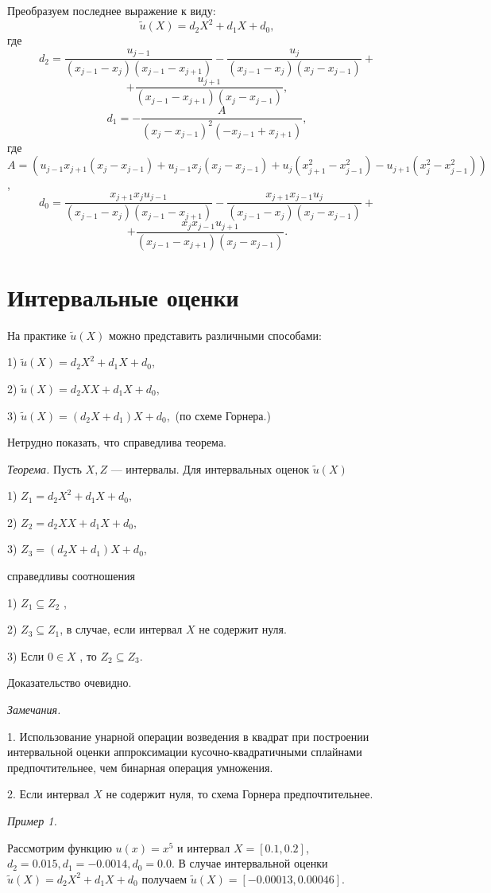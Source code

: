 \documentclass{spisok-article}
\begin{document}
Преобразуем последнее выражение к виду:
$$\widetilde{u}(X)=d_2X^2+d_1X+d_0,$$ где
  $$d_2= \frac{u_{j-1}}{(x_{j-1}-x_j)(x_{j-1}-x_{j+1})}-
  \frac{u_{j}}{(x_{j-1}-x_j)(x_j-x_{j-1})}+$$ $$+\frac{u_{j+1}}
  {(x_{j-1}-x_{j+1})(x_j-x_{j-1})},$$
$$d_1=  -\frac{A}{(x_j-x_{j-1})^2(-x_{j-1}+x_{j+1})},$$
где $A=(u_{j-1}x_{j+1}(x_j-x_{j-1})+u_{j-1}x_j(x_j-x_{j-1})
+u_j(x_{j+1}^2-x_{j-1}^2)-u_{j+1}(x_j^2-x_{j-1}^2))$,
$$d_0= \frac{x_{j+1}x_ju_{j-1}}{(x_{j-1}-x_j)(x_{j-1}-x_{j+1})}
-\frac{x_{j+1}x_{j-1}u_j}{(x_{j-1}-x_j)(x_j-x_{j-1})} +$$$$
+\frac{x_jx_{j-1}u_{j+1}}{(x_{j-1}-x_{j+1})(x_j-x_{j-1})}.$$

\section{Интервальные оценки}
На практике  $\widetilde{u}(X)$  можно представить различными способами:

1) $\widetilde{u}(X)=d_2X^2+d_1X+d_0,$

        2) $\widetilde{u}(X)=d_2XX+d_1X+d_0,$

3)   $\widetilde{u}(X)=(d_2X+d_1)X+d_0,$ (по схеме Горнера.)


\noindent Нетрудно показать, что справедлива теорема.

\bigskip
{\it Теорема.}
Пусть  $X, Z$ --- интервалы. Для интервальных оценок $\widetilde{u}(X)$

 1) $Z_1=d_2X^2+d_1X+d_0,$

        2) $Z_2=d_2XX+d_1X+d_0,$

3)   $Z_3=(d_2X+d_1)X+d_0,$

 \noindent справедливы соотношения

1)  $Z_1\subseteq Z_2$ ,

2)  $Z_3\subseteq Z_1$, в случае, если интервал $X$  не содержит нуля.

3) Если  $0\in X$ , то $Z_2\subseteq Z_3$.

Доказательство очевидно.

\bigskip
{\it Замечания.}

 1. Использование унарной операции возведения в квадрат при построении интервальной оценки аппроксимации кусочно-квадратичными сплайнами предпочтительнее, чем бинарная операция умножения.

2. Если интервал  $X$ не содержит нуля, то схема Горнера предпочтительнее.


\bigskip
{\it Пример 1.}

Рассмотрим функцию $u(x)=x^5$  и интервал $X=[0.1, 0.2]$,
$d_2 = 0.015,	d_1 = -0.0014, 	d_0 = 0.0$.
В случае интервальной оценки  $\widetilde{u}(X)=d_2X^2+d_1X+d_0$
получаем $\widetilde{u}(X)=[-0.00013,0.00046]$.
\end{document}
